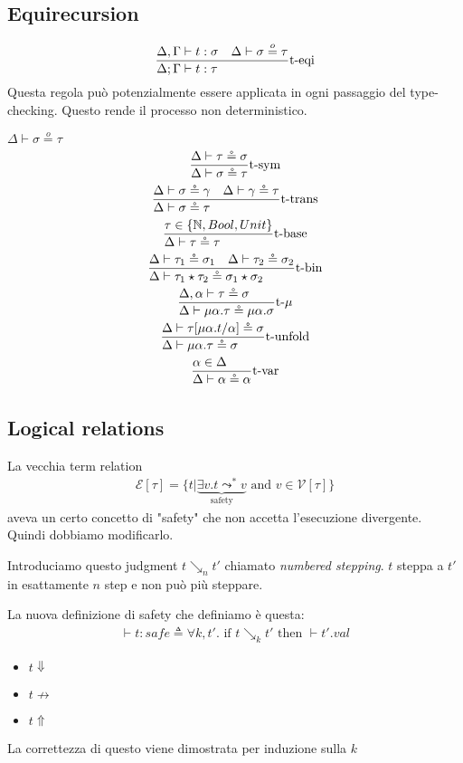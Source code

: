 \documentclass{article}
\newcommand{\st}[3][]{\ensuremath \displaystyle\frac{#3\hfill}{#2\hfill} \text{#1}}
\newcommand{\N}{\ensuremath \mathbb N}
\newcommand{\V}{\ensuremath{\mathcal{V}}}
\newcommand{\cE}{\ensuremath{\mathcal{E}}}
\newcommand{\IF}[0]{\ensuremath {\text{ if }}}
\newcommand{\THEN}[0]{\ensuremath {\text{ then }}}
\newcommand{\AND}[0]{\ensuremath {\text{ and }}}
\begin{document}
\subsection{Equirecursion}
\begin{gather*}
    \st[t-eqi]{
        \Delta;\Gamma\vdash t:\tau
    }{
        \Delta,\Gamma \vdash t:\sigma
        \quad
        \Delta \vdash \sigma \overset o= \tau
    }
\end{gather*}
Questa regola può potenzialmente essere applicata in ogni passaggio del type-checking. Questo rende il processo non deterministico.

$\Delta\vdash \sigma\overset o= \tau$
\begin{gather*}
    \st[t-sym]{\Delta\vdash\sigma\circeq\tau}{\Delta\vdash\tau\circeq\sigma} \\
    \st[t-trans]{\Delta\vdash\sigma\circeq\tau}{\Delta\vdash\sigma\circeq\gamma\quad \Delta\vdash\gamma\circeq\tau} \\
    \st[t-base]{\Delta\vdash\tau\circeq\tau}{\tau\in\{\N,Bool,Unit\}} \\
    \st[t-bin]{\Delta\vdash\tau_1\star\tau_2\circeq\sigma_1\star\sigma_2}{\Delta\vdash\tau_1\circeq\sigma_1\quad\Delta\vdash\tau_2\circeq\sigma_2} \\
    \st[t-$\mu$]{\Delta\vdash\mu\alpha.\tau \circeq \mu\alpha.\sigma}{\Delta,\alpha\vdash \tau\circeq\sigma} \\
    \st[t-unfold]{\Delta\vdash\mu\alpha.\tau\circeq\sigma}{\Delta\vdash\tau[\mu\alpha.t/\alpha]\circeq\sigma} \\
    \st[t-var]{\Delta\vdash\alpha\circeq\alpha}{\alpha\in\Delta} \\
\end{gather*}

\subsection{Logical relations}
La vecchia term relation
\begin{align*}
    \cE[\tau]=\{t|\underbrace{\exists v.t\leadsto^* v}_\text{safety}\AND v\in\V[\tau]\}
\end{align*}
aveva un certo concetto di "safety" che non accetta l'esecuzione divergente. Quindi dobbiamo modificarlo.

Introduciamo questo judgment $t\searrow_n t'$ chiamato \textit{numbered stepping}. $t$ steppa a $t'$ in esattamente $n$ step e non può più steppare.

La nuova definizione di safety che definiamo è questa:
\begin{align*}
    \vdash t:safe\triangleq \forall k,t'.\IF t\searrow_k t'\THEN \vdash t'.val
\end{align*}
\begin{itemize}
    \item $t\Downarrow$ 
    \item $t\not\to$
    \item $t\Uparrow$
\end{itemize}
La correttezza di questo viene dimostrata per induzione sulla $k$
\end{document}
